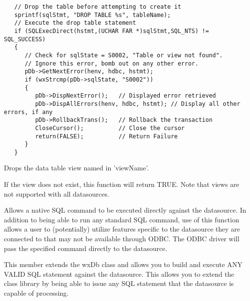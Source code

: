 
\begin{verbatim}
   // Drop the table before attempting to create it
   sprintf(sqlStmt, "DROP TABLE %s", tableName);
   // Execute the drop table statement
   if (SQLExecDirect(hstmt,(UCHAR FAR *)sqlStmt,SQL_NTS) != SQL_SUCCESS)
   {
      // Check for sqlState = S0002, "Table or view not found".
      // Ignore this error, bomb out on any other error.
      pDb->GetNextError(henv, hdbc, hstmt);
      if (wxStrcmp(pDb->sqlState, "S0002"))
      {
         pDb->DispNextError();   // Displayed error retrieved
         pDb->DispAllErrors(henv, hdbc, hstmt); // Display all other errors, if any
         pDb->RollbackTrans();   // Rollback the transaction
         CloseCursor();          // Close the cursor
         return(FALSE);          // Return Failure
      }
   }
\end{verbatim}


\label{wxdbdropview}


Drops the data table view named in 'viewName'.




If the view does not exist, this function will return TRUE.  Note that views are not supported with all datasources.

\label{wxdbexecsql}



Allows a native SQL command to be executed directly against the datasource.  In addition to being able to run any standard SQL command, use of this function allows a user to (potentially) utilize features specific to the datasource they are connected to that may not be available through ODBC.  The ODBC driver will pass the specified command directly to the datasource.




This member extends the wxDb class and allows you to build and execute ANY VALID
SQL statement against the datasource.  This allows you to extend the class 
library by being able to issue any SQL statement that the datasource is capable
of processing.

